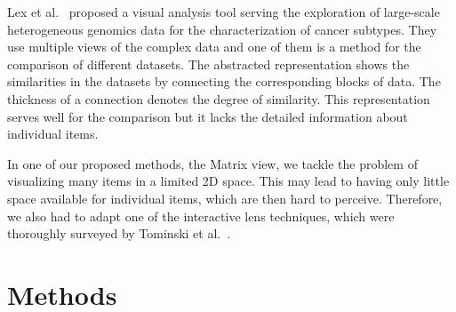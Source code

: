\documentclass{bmcart}
\def\MatView {Matrix view\xspace}
\begin{document}

Lex et al.~\cite{Lex2012} proposed a visual analysis tool serving the exploration of large-scale heterogeneous genomics data for the characterization of cancer subtypes.
They use multiple views of the complex data and one of them is a method for the comparison of different datasets.
The abstracted representation shows the similarities in the datasets by connecting the corresponding blocks of data. 
The thickness of a connection denotes the degree of similarity. 
This representation serves well for the comparison but it lacks the detailed information about individual items.

In one of our proposed methods, the \MatView, we tackle the problem of visualizing many items in a limited 2D space.
This may lead to having only little space available for individual items, which are then hard to perceive.
Therefore, we also had to adapt one of the interactive lens techniques, which were thoroughly surveyed by Tominski et al.~\cite{Tominski2014}.

\section*{Methods}
\end{document}

